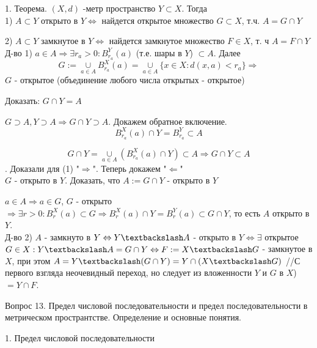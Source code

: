 \documentclass[12pt]{article}
\begin{document}
1. Теорема. $(X, d)$ -метр пространство $Y \subset X$. Тогда\\

1) $A \subset Y$ открыто в $Y \Leftrightarrow$ найдется открытое множество $G \subset X$, т.ч. $A=G\cap Y$

2) $A \subset Y$ замкнутое в $Y \Leftrightarrow$ найдется замкнутое множество $F \in X $, т. ч $A = F\cap Y$\\

Д-во 1) $a \in A \Rightarrow \exists r_a>0 : B_{r_a}^Y(a)$ (т.е. шары в $Y$) $\subset A$. Далее \\

\[G:= \underset{a\in A}{\cup} B_{r_a}^X(a) = \underset{a\in A}{\cup} \{x \in X: d(x, a)<r_a\} \Rightarrow\] $G$ - открытое (объединение любого числа открытых - открытое)

Доказать: $G\cap Y = A$

$G \supset A, Y \supset A \Rightarrow G\cap Y \supset A$. Докажем обратное включение.\\

\[B_{r_a}^X(a)\cap Y = B_{r_a}^Y \subset A\]

\[G\cap Y = \underset{a\in A}{\cup}(B_{r_a}^X(a) \cap Y) \subset A \Rightarrow G\cap Y \subset A \]. Доказали для (1) "$\Rightarrow$". Теперь докажем "$\Leftarrow$"\\

$G$ - открыто в $Y$. Доказать, что $A := G\cap Y$ - открыто в $Y$

$a \in A \Rightarrow a \in G$, $G$ - открыто$ \Rightarrow \exists r>0 : B_r^X(a) \subset G \Rightarrow B_r^X(a)\cap Y = B_r^Y(a) \subset G\cap Y$, то есть $A$ открыто в $Y$.\\

Д-во 2) $A$ - замкнуто в $Y \Leftrightarrow Y\textbackslash A$ - открыто в $Y \Leftrightarrow \exists$ открытое $G \in X : Y\textbackslash A = G\cap Y \Leftrightarrow F := X\textbackslash G$ - замкнутое в $X$, при этом $A = Y\textbackslash (G\cap Y) = Y\cap (X\textbackslash G)$ //С первого взгляда неочевидный переход, но следует из вложенности $Y$ и $G$ в $X$) $= Y\cap F$.
  
\newpage

\begin{center}
Вопрос 13. Предел числовой последовательности и предел последовательности в метрическом пространтстве. Определение и основные понятия.
\end{center}

1. Предел числовой последовательности
\end{document}
